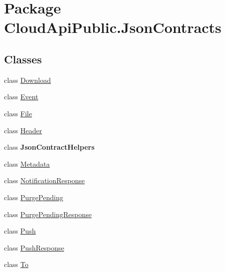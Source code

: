 \hypertarget{namespace_cloud_api_public_1_1_json_contracts}{\section{Package Cloud\-Api\-Public.\-Json\-Contracts}
\label{namespace_cloud_api_public_1_1_json_contracts}
}
\subsection*{Classes}
\begin{DoxyCompactItemize}
\item 
class \hyperlink{class_cloud_api_public_1_1_json_contracts_1_1_download}{Download}
\item 
class \hyperlink{class_cloud_api_public_1_1_json_contracts_1_1_event}{Event}
\item 
class \hyperlink{class_cloud_api_public_1_1_json_contracts_1_1_file}{File}
\item 
class \hyperlink{class_cloud_api_public_1_1_json_contracts_1_1_header}{Header}
\item 
class {\bfseries Json\-Contract\-Helpers}
\item 
class \hyperlink{class_cloud_api_public_1_1_json_contracts_1_1_metadata}{Metadata}
\item 
class \hyperlink{class_cloud_api_public_1_1_json_contracts_1_1_notification_response}{Notification\-Response}
\item 
class \hyperlink{class_cloud_api_public_1_1_json_contracts_1_1_purge_pending}{Purge\-Pending}
\item 
class \hyperlink{class_cloud_api_public_1_1_json_contracts_1_1_purge_pending_response}{Purge\-Pending\-Response}
\item 
class \hyperlink{class_cloud_api_public_1_1_json_contracts_1_1_push}{Push}
\item 
class \hyperlink{class_cloud_api_public_1_1_json_contracts_1_1_push_response}{Push\-Response}
\item 
class \hyperlink{class_cloud_api_public_1_1_json_contracts_1_1_to}{To}
\end{DoxyCompactItemize}
